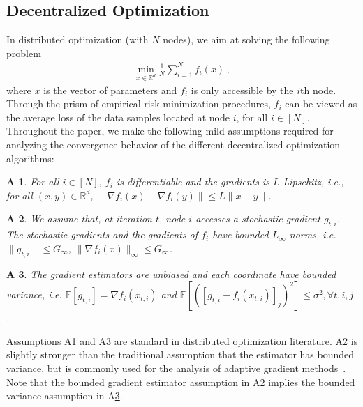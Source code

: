 \documentclass{article} %
\newtheorem{assumptionA}{A\!\!}
\begin{document}
\vspace{-0.05in}
\subsection{Decentralized Optimization }
\vspace{-0.05in}

In distributed optimization (with $N$ nodes), we aim at solving the following problem
\begin{align}\label{eq:minproblem}
\min_{x \in \mathbb{R}^d} \frac{1}{N}\sum_{i=1}^N f_i(x) \, ,
\end{align}
where $x$ is the vector of parameters and $f_i$ is only accessible by the $i$th node. 
Through the prism of empirical risk minimization procedures, $f_i$ can be viewed as the average loss of the data samples located at node $i$, for all $i \in [N]$. 
Throughout the paper, we make the following mild assumptions required for analyzing the convergence behavior of the different decentralized optimization algorithms:
\begin{assumptionA}\label{a:diff}
For all $i \in [N]$, $f_i$ is differentiable and the gradients is $L$-Lipschitz, i.e., for all $(x, y) \in \mathbb{R}^d$, $\|\nabla f_i(x) - \nabla f_i(y) \| \leq L\|x-y\|$.
\end{assumptionA}
\begin{assumptionA}\label{a:boundsto}
We assume that, at iteration $t$, node $i$ accesses a stochastic gradient $g_{t,i}$. The stochastic gradients and the gradients of $f_i$ have bounded $L_{\infty}$ norms, i.e. $\|g_{t,i}\| \leq G_{\infty}$, $\|\nabla f_i(x)\|_{\infty} \leq G_{\infty}$. 
\end{assumptionA}
\begin{assumptionA}\label{a:boundedvar}
The gradient estimators are unbiased and each coordinate have bounded variance, i.e. $\mathbb E [g_{t,i}] = \nabla f_i(x_{t,i}) $ and $\mathbb E [([g_{t,i} - f_i(x_{t,i})]_j)^2] \leq  \sigma^2, \forall t,i,j$ . 
\end{assumptionA}
Assumptions A\ref{a:diff} and A\ref{a:boundedvar} are standard in distributed optimization literature. A\ref{a:boundsto} is slightly stronger than the traditional assumption that the estimator has bounded variance, but is commonly used for the analysis of adaptive gradient methods~\citep{chen2018convergence,ward2019adagrad}. 
Note that the bounded gradient estimator assumption in A\ref{a:boundsto} implies the bounded variance assumption in A\ref{a:boundedvar}.
\end{document}
